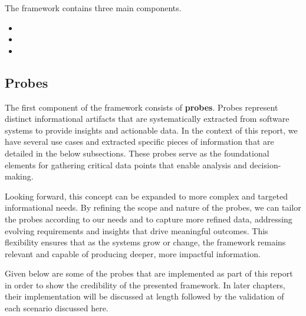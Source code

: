 The framework contains three main components.
\begin{itemize}
    \item {}
    \item {}
    \item {}
\end{itemize}


\subsection{Probes}\label{subsec:component-probes}

The first component of the framework consists of \textbf{probes}. Probes represent distinct informational artifacts that are systematically extracted from software systems to provide insights and actionable data. In the context of this report, we have several use cases and extracted specific pieces of information that are detailed in the below subsections. These probes serve as the foundational elements for gathering critical data points that enable analysis and decision-making. 

Looking forward, this concept can be expanded to more complex and targeted informational needs. By refining the scope and nature of the probes, we can tailor the probes according to our needs and to capture more refined data, addressing evolving requirements and insights that drive meaningful outcomes. This flexibility ensures that as the systems grow or change, the framework remains relevant and capable of producing deeper, more impactful information.

Given below are some of the probes that are implemented as part of this report in order to show the credibility of the presented framework. In later chapters, their implementation will be discussed at length followed by the validation of each scenario discussed here.

